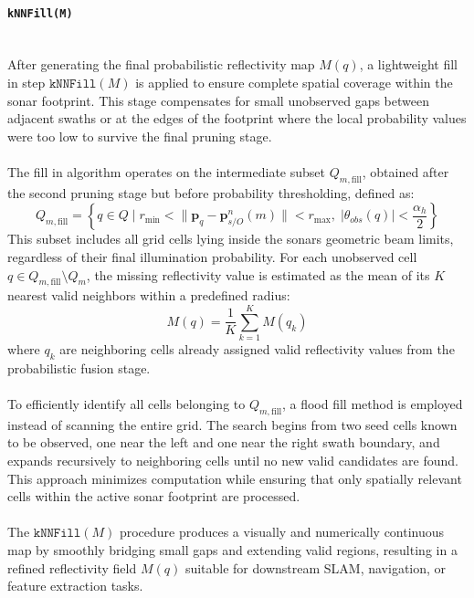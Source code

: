 \paragraph{\texttt{kNNFill(M)}} \mbox{}\\[0.5em] \noindent  
After generating the final probabilistic reflectivity map $M(q)$, a lightweight fill in step $\texttt{kNNFill}(M)$ is applied to ensure complete spatial coverage within the sonar footprint. This stage compensates for small unobserved gaps between adjacent swaths or at the edges of the footprint where the local probability values were too low to survive the final pruning stage.  
\\ \\
The fill in algorithm operates on the intermediate subset $Q_{m,\text{fill}}$, obtained after the second pruning stage but before probability thresholding, defined as:
\begin{equation}
    Q_{m,\text{fill}} = \left\{
        q \in Q \; \bigg| \;
        r_{\min} < \| \mathbf{p}_q - \mathbf{p}_{s/O}^{n}(m) \| < r_{\max},
        \;
        |\theta_{obs}(q)| < \frac{\alpha_h}{2}
    \right\}
    \label{eq:local-map-generation-fillin-domain}
\end{equation}
This subset includes all grid cells lying inside the sonars geometric beam limits, regardless of their final illumination probability. For each unobserved cell $q \in Q_{m,\text{fill}} \setminus Q_m$, the missing reflectivity value is estimated as the mean of its $K$ nearest valid neighbors within a predefined radius:
\begin{equation}
    M(q) = \frac{1}{K} \sum_{k=1}^{K} M(q_k)
    \label{eq:local-map-generation-post-processing-fillin-fast}
\end{equation}
where $q_k$ are neighboring cells already assigned valid reflectivity values from the probabilistic fusion stage.  
\\ \\
To efficiently identify all cells belonging to $Q_{m,\text{fill}}$, a flood fill method is employed instead of scanning the entire grid. The search begins from two seed cells known to be observed, one near the left and one near the right swath boundary, and expands recursively to neighboring cells until no new valid candidates are found. This approach minimizes computation while ensuring that only spatially relevant cells within the active sonar footprint are processed.  
\\ \\
The $\texttt{kNNFill}(M)$ procedure produces a visually and numerically continuous map by smoothly bridging small gaps and extending valid regions, resulting in a refined reflectivity field $M(q)$ suitable for downstream SLAM, navigation, or feature extraction tasks.

